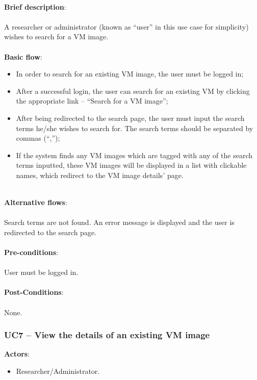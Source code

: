 \ \\
\textbf{Brief description}:\\
\ \\
A researcher or administrator (known as ``user'' in this use case for simplicity) wishes to search for a VM image.\\
\ \\
\textbf{Basic flow}:

\begin{itemize}
\item In order to search for an existing VM image, the user must be logged in;
\item After a successful login, the user can search for an existing VM by clicking the appropriate link -- ``Search for a VM image'';
\item After being redirected to the search page, the user must input the search terms he/she wishes to search for. The search terms should be separated by commas (``,'');
\item If the system finds any VM images which are tagged with any of the search terms inputted, these VM images will be displayed in a list with clickable names, which redirect to the VM image details' page.
\end{itemize}

\ \\
\textbf{Alternative flows}:\\
\ \\
Search terms are not found. An error message is displayed and the user is redirected to the search page.\\
\ \\
\textbf{Pre-conditions}:\\
\ \\
User must be logged in.\\
\ \\
\textbf{Post-Conditions}:\\
\ \\
None.


\subsubsection{UC7 -- View the details of an existing VM image}\label{uc7}

\textbf{Actors}:

\begin{itemize}
\item Researcher/Administrator.
\end{itemize}

